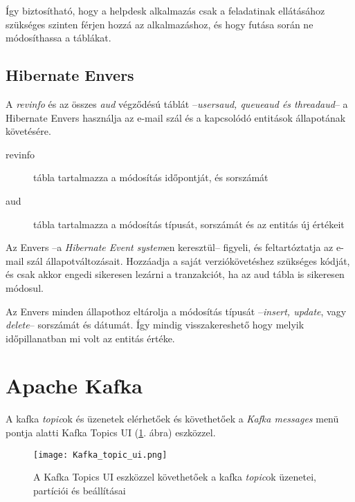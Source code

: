 Így biztosítható, hogy a helpdesk alkalmazás csak a feladatinak ellátásához szükséges szinten férjen hozzá az alkalmazáshoz, és hogy futása során ne módosíthassa a táblákat. 


\subsection{Hibernate Envers}\label{sec:hubernate_envers}
A \textit{revinfo} és az összes \textit{\textunderscore aud} végződésú táblát --\textit{\mbox{users\textunderscore aud}, \mbox{queue\textunderscore aud} és \mbox{thread\textunderscore aud}}-- a Hibernate Envers használja az e-mail szál és a kapcsolódó entitások állapotának követésére.

\begin{description}
	\item[revinfo] tábla tartalmazza a módosítás időpontját, és sorszámát
	
	\item[\textunderscore aud] tábla tartalmazza a módosítás típusát, sorszámát és az entitás új értékeit
\end{description}

Az Envers --a \textit{Hibernate Event system}en keresztül-- figyeli, és feltartóztatja az e-mail szál állapotváltozásait. Hozzáadja a saját verziókövetéshez szükséges kódját, és csak akkor engedi sikeresen lezárni a tranzakciót, ha az \textunderscore aud tábla is sikeresen módosul.

Az Envers minden állapothoz eltárolja a módosítás típusát --\textit{insert, update}, vagy \textit{delete}-- sorszámát és dátumát. Így mindig visszakereshető hogy melyik időpillanatban mi volt az entitás értéke.



\section{Apache Kafka}\label{sec:kafka_topics}
A kafka \textit{topic}ok és üzenetek elérhetőek és követhetőek a \textit{Kafka messages} menü pontja alatti Kafka Topics UI (\ref{fig:Kafka_Topics_UI}. ábra) eszközzel.

\begin{figure}[hbt] 
	\centering
	\texttt{[image: Kafka\_topic\_ui.png]}
	\caption[A Kafka Topics UI felülete]{A Kafka Topics UI eszközzel követhetőek a kafka \textit{topic}ok üzenetei, partíciói és beállításai}
	\label{fig:Kafka_Topics_UI}
\end{figure}


